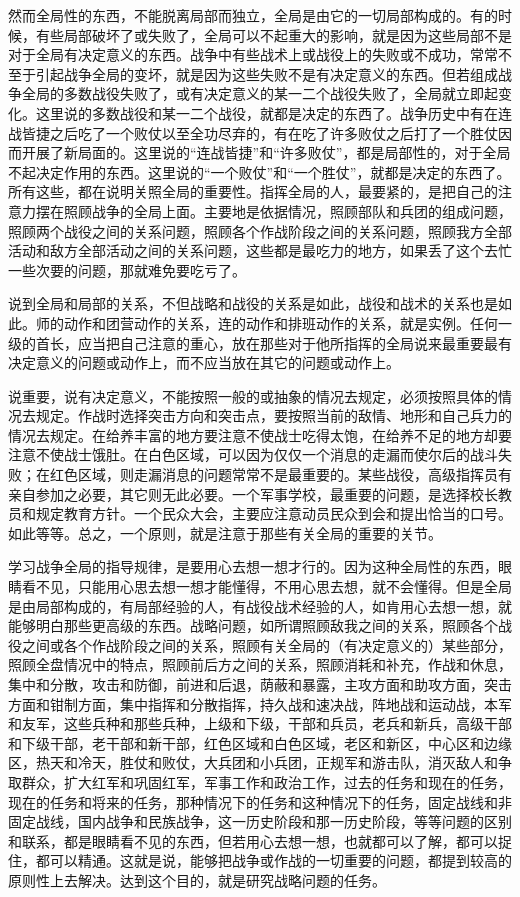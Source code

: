 然而全局性的东西，不能脱离局部而独立，全局是由它的一切局部构成的。有的时候，有些局部破坏了或失败了，全局可以不起重大的影响，就是因为这些局部不是对于全局有决定意义的东西。战争中有些战术上或战役上的失败或不成功，常常不至于引起战争全局的变坏，就是因为这些失败不是有决定意义的东西。但若组成战争全局的多数战役失败了，或有决定意义的某一二个战役失败了，全局就立即起变化。这里说的多数战役和某一二个战役，就都是决定的东西了。战争历史中有在连战皆捷之后吃了一个败仗以至全功尽弃的，有在吃了许多败仗之后打了一个胜仗因而开展了新局面的。这里说的“连战皆捷”和“许多败仗”，都是局部性的，对于全局不起决定作用的东西。这里说的“一个败仗”和“一个胜仗”，就都是决定的东西了。所有这些，都在说明关照全局的重要性。指挥全局的人，最要紧的，是把自己的注意力摆在照顾战争的全局上面。主要地是依据情况，照顾部队和兵团的组成问题，照顾两个战役之间的关系问题，照顾各个作战阶段之间的关系问题，照顾我方全部活动和敌方全部活动之间的关系问题，这些都是最吃力的地方，如果丢了这个去忙一些次要的问题，那就难免要吃亏了。

说到全局和局部的关系，不但战略和战役的关系是如此，战役和战术的关系也是如此。师的动作和团营动作的关系，连的动作和排班动作的关系，就是实例。任何一级的首长，应当把自己注意的重心，放在那些对于他所指挥的全局说来最重要最有决定意义的问题或动作上，而不应当放在其它的问题或动作上。

说重要，说有决定意义，不能按照一般的或抽象的情况去规定，必须按照具体的情况去规定。作战时选择突击方向和突击点，要按照当前的敌情、地形和自己兵力的情况去规定。在给养丰富的地方要注意不使战士吃得太饱，在给养不足的地方却要注意不使战士饿肚。在白色区域，可以因为仅仅一个消息的走漏而使尔后的战斗失败；在红色区域，则走漏消息的问题常常不是最重要的。某些战役，高级指挥员有亲自参加之必要，其它则无此必要。一个军事学校，最重要的问题，是选择校长教员和规定教育方针。一个民众大会，主要应注意动员民众到会和提出恰当的口号。如此等等。总之，一个原则，就是注意于那些有关全局的重要的关节。

学习战争全局的指导规律，是要用心去想一想才行的。因为这种全局性的东西，眼睛看不见，只能用心思去想一想才能懂得，不用心思去想，就不会懂得。但是全局是由局部构成的，有局部经验的人，有战役战术经验的人，如肯用心去想一想，就能够明白那些更高级的东西。战略问题，如所谓照顾敌我之间的关系，照顾各个战役之间或各个作战阶段之间的关系，照顾有关全局的（有决定意义的）某些部分，照顾全盘情况中的特点，照顾前后方之间的关系，照顾消耗和补充，作战和休息，集中和分散，攻击和防御，前进和后退，荫蔽和暴露，主攻方面和助攻方面，突击方面和钳制方面，集中指挥和分散指挥，持久战和速决战，阵地战和运动战，本军和友军，这些兵种和那些兵种，上级和下级，干部和兵员，老兵和新兵，高级干部和下级干部，老干部和新干部，红色区域和白色区域，老区和新区，中心区和边缘区，热天和冷天，胜仗和败仗，大兵团和小兵团，正规军和游击队，消灭敌人和争取群众，扩大红军和巩固红军，军事工作和政治工作，过去的任务和现在的任务，现在的任务和将来的任务，那种情况下的任务和这种情况下的任务，固定战线和非固定战线，国内战争和民族战争，这一历史阶段和那一历史阶段，等等问题的区别和联系，都是眼睛看不见的东西，但若用心去想一想，也就都可以了解，都可以捉住，都可以精通。这就是说，能够把战争或作战的一切重要的问题，都提到较高的原则性上去解决。达到这个目的，就是研究战略问题的任务。

